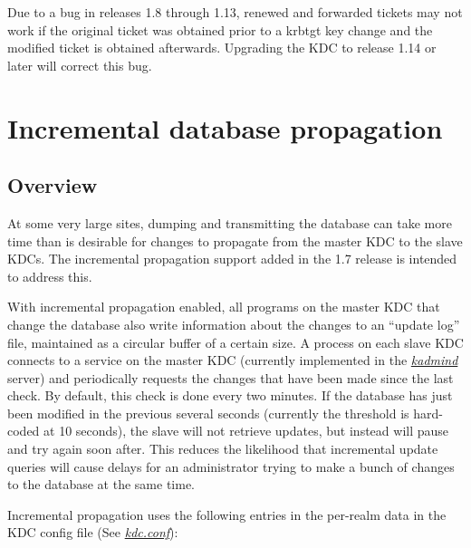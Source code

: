 \documentclass[letterpaper,10pt,english]{sphinxmanual}
\begin{document}
Due to a bug in releases 1.8 through 1.13, renewed and forwarded
tickets may not work if the original ticket was obtained prior to a
krbtgt key change and the modified ticket is obtained afterwards.
Upgrading the KDC to release 1.14 or later will correct this bug.


\section{Incremental database propagation}
\label{admin/database:incremental-database-propagation}\label{admin/database:incr-db-prop}

\subsection{Overview}
\label{admin/database:overview}
At some very large sites, dumping and transmitting the database can
take more time than is desirable for changes to propagate from the
master KDC to the slave KDCs.  The incremental propagation support
added in the 1.7 release is intended to address this.

With incremental propagation enabled, all programs on the master KDC
that change the database also write information about the changes to
an ``update log'' file, maintained as a circular buffer of a certain
size.  A process on each slave KDC connects to a service on the master
KDC (currently implemented in the {\hyperref[admin/admin_commands/kadmind:kadmind-8]{\emph{kadmind}}} server) and
periodically requests the changes that have been made since the last
check.  By default, this check is done every two minutes.  If the
database has just been modified in the previous several seconds
(currently the threshold is hard-coded at 10 seconds), the slave will
not retrieve updates, but instead will pause and try again soon after.
This reduces the likelihood that incremental update queries will cause
delays for an administrator trying to make a bunch of changes to the
database at the same time.

Incremental propagation uses the following entries in the per-realm
data in the KDC config file (See {\hyperref[admin/conf_files/kdc_conf:kdc-conf-5]{\emph{kdc.conf}}}):
\end{document}
